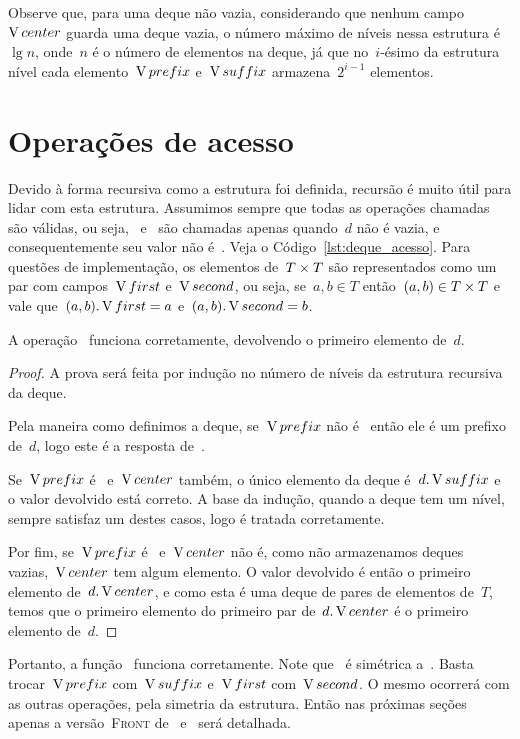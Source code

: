 \documentclass[main.tex]{subfiles}
\begin{document}
Observe que, para uma deque não vazia, considerando que nenhum campo~$\operatorname{V}{center}$ guarda uma deque vazia, o número máximo de níveis nessa estrutura é~$\lg n$, onde~$n$ é o número de elementos na deque, já que no~$i$-ésimo da estrutura nível cada elemento~$\operatorname{V}{prefix}$ e~$\operatorname{V}{suffix}$ armazena~$2^{i-1}$ elementos.


\section{Operações de acesso}

Devido à forma recursiva como a estrutura foi definida, recursão é muito útil para lidar com esta estrutura.
Assumimos sempre que todas as operações chamadas são válidas, ou seja,~ e~ são chamadas apenas quando~$d$ não é vazia, e consequentemente seu valor não é~. Veja o Código~\ref{lst:deque_acesso}. Para questões de implementação, os elementos de~$T \times T$ são representados como um par com campos~$\operatorname{V}{first}$ e~$\operatorname{V}{second}$, ou seja, se~$a, b \in T$ então~$(a, b) \in T \times T$ e vale que~$(a, b).\operatorname{V}{first} = a$ e~$(a, b).\operatorname{V}{second} = b$.


\begin{proposition}
A operação~ funciona corretamente, devolvendo o primeiro elemento de~$d$.
\end{proposition}

\begin{proof}
A prova será feita por indução no número de níveis da estrutura recursiva da deque.

Pela maneira como definimos a deque, se~$\operatorname{V}{prefix}$ não é~ então ele é um prefixo de~$d$, logo este é a resposta de~.

Se~$\operatorname{V}{prefix}$ é~ e~$\operatorname{V}{center}$ também, o único elemento da deque é~$d.\operatorname{V}{suffix}$ e o valor devolvido está correto. A base da indução, quando a deque tem um nível, sempre satisfaz um destes casos, logo é tratada corretamente.

Por fim, se~$\operatorname{V}{prefix}$ é~ e~$\operatorname{V}{center}$ não é, como não armazenamos deques vazias,~$\operatorname{V}{center}$ tem algum elemento. O valor devolvido é então o primeiro elemento de~$d.\operatorname{V}{center}$, e como esta é uma deque de pares de elementos de~$T$, temos que o primeiro elemento do primeiro par de~$d.\operatorname{V}{center}$ é o primeiro elemento de~$d$.
\end{proof}

Portanto, a função~ funciona corretamente.
Note que~ é simétrica a~. Basta trocar~$\operatorname{V}{prefix}$ com~$\operatorname{V}{suffix}$ e~$\operatorname{V}{first}$ com~$\operatorname{V}{second}$. O mesmo ocorrerá com as outras operações, pela simetria da estrutura. Então nas próximas seções apenas a versão~\textsc{Front} de~ e~ será detalhada.
\end{document}
